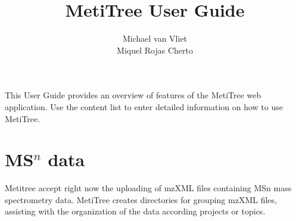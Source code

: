 \documentclass[12pt]{report}
\begin{document}
\title{MetiTree User Guide}
\author{
Michael van Vliet\\
Miquel Rojas Cherto}
\renewcommand{\today}{March 2012}

\maketitle

\newpage
This User Guide provides an overview of features of the MetiTree web application. Use 
the content list to enter detailed information on how to use MetiTree. 

\begin{center}
\begin{figure}[h!]	
\end{figure}
\end{center}


\section{MS$^n$ data}
\newline

Metitree accept right now the uploading of mzXML files containing MSn mass spectrometry data. MetiTree creates directories for grouping mzXML files, assisting with the organization of the data according projects or topics. 
\end{document}
